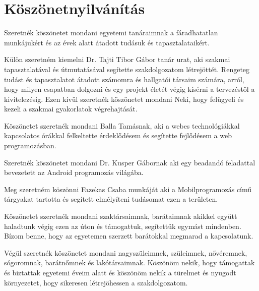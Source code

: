 \documentclass[
]{thesis-ekf}
\theoremstyle{definition}
\theoremstyle{remark}
\begin{document}
	\chapter{Köszönetnyilvánítás}
	Szeretnék köszönetet mondani egyetemi tanáraimnak a fáradhatatlan munkájukért és az évek alatt átadott tudásuk és tapasztalataikért. 
	
	Külön szeretném kiemelni Dr. Tajti Tibor Gábor tanár urat, aki szakmai tapasztalatával és útmutatásával segítette szakdolgozatom létrejöttét. Rengeteg tudást és tapasztalatot átadott számomra és hallgatói társaim számára, arról, hogy milyen csapatban dolgozni és egy projekt életét végig kísérni a tervezéstől a kivitelezésig. Ezen kívül szeretnék köszönetet mondani Neki, hogy felügyeli és kezeli a szakmai gyakorlatok végrehajtását. 
	
	Köszönetet szeretnék mondani Balla Tamásnak, aki a webes technológiákkal kapcsolatos órákkal felkeltette érdeklődésem és segítette fejlődésem a web programozásban.
	
	Szeretnék köszönetet mondani Dr. Kusper Gábornak aki egy beadandó feladattal bevezetett az Android programozás világába.
	
	Meg szeretném köszönni Fazekas Csaba munkáját aki a Mobilprogramozás című tárgyakat tartotta és segített elmélyíteni tudásomat ezen a területen.
	
	Köszönetet szeretnék mondani szaktársaimnak, barátaimnak akikkel együtt haladtunk végig ezen az úton és támogattuk, segítettük egymást mindenben. Bízom benne, hogy az egyetemen szerzett barátokkal megmarad a kapcsolatunk. 
	
	Végül szeretnék köszönetet mondani nagyszüleimnek, szüleimnek, nővéremnek, sógoromnak, barátnőmnek és lakótársaimnak. Köszönöm nekik, hogy támogattak és biztattak egyetemi éveim alatt és köszönöm nekik a türelmet és nyugodt környezetet, hogy sikeresen létrejöhessen a szakdolgozatom.
	
\end{document}
